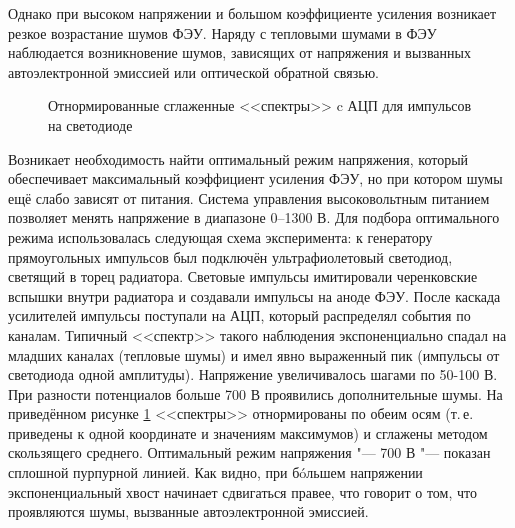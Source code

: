 \documentclass[12pt,a4paper]{report} %
\begin{document}
Однако при высоком напряжении и большом коэффициенте усиления возникает резкое возрастание шумов ФЭУ. Наряду с тепловыми шумами в ФЭУ наблюдается возникновение шумов, зависящих от напряжения и вызванных автоэлектронной эмиссией или оптической обратной связью.
\begin{figure}[th]
	\noindent{}
	\caption{Отнормированные сглаженные <<спектры>> c АЦП для импульсов на светодиоде}
	\label{UVlight}
\end{figure}

Возникает необходимость найти оптимальный режим напряжения, который обеспечивает максимальный коэффициент усиления ФЭУ, но при котором шумы ещё слабо зависят от питания. Система управления высоковольтным питанием позволяет менять напряжение в диапазоне 0--1300 В. Для подбора оптимального режима использовалась следующая схема эксперимента: к генератору прямоугольных импульсов был подключён ультрафиолетовый светодиод, светящий в торец радиатора. Световые импульсы имитировали черенковские вспышки внутри радиатора и создавали импульсы на аноде ФЭУ. После каскада усилителей импульсы поступали на АЦП, который распределял события по каналам. Типичный <<спектр>> такого наблюдения экспоненциально спадал на младших каналах (тепловые шумы) и имел явно выраженный пик (импульсы от светодиода одной амплитуды). Напряжение увеличивалось шагами по 50-100 В. При разности потенциалов больше 700 В проявились дополнительные шумы. На приведённом рисунке \ref{UVlight} <<спектры>> отнормированы по обеим осям (т.\,е. приведены к одной координате и значениям максимумов) и сглажены методом скользящего среднего. Оптимальный режим напряжения "--- 700 В "--- показан сплошной пурпурной линией. Как видно, при б\'oльшем напряжении экспоненциальный хвост начинает сдвигаться правее, что говорит о том, что проявляются шумы, вызванные автоэлектронной эмиссией. 
\end{document}
